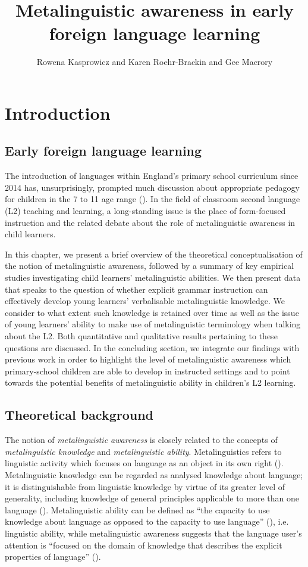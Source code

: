\documentclass[output=paper]{langscibook}
\author{Rowena Kasprowicz\orcid{}\affiliation{University of Reading} and Karen Roehr-Brackin\orcid{}\affiliation{University of Essex} and Gee Macrory\orcid{}\affiliation{Manchester Metropolitan University}}
\title{Metalinguistic awareness in early foreign language learning}
\begin{document}
\maketitle

\section{Introduction}
\subsection{Early foreign language learning}

The introduction of languages within England’s primary school curriculum since 2014 has, unsurprisingly, prompted much discussion about appropriate pedagogy for children in the 7 to 11 age range (\citealt{HolmesMyles2019}). In the field of classroom second language (L2) teaching and learning, a long-standing issue is the place of form-focused instruction and the related debate about the role of metalinguistic awareness in child learners.

In this chapter, we present a brief overview of the theoretical conceptualisation of the notion of metalinguistic awareness, followed by a summary of key empirical studies investigating child learners’ metalinguistic abilities. We then present data that speaks to the question of whether explicit grammar instruction can effectively develop young learners’ verbalisable metalinguistic knowledge. We consider to what extent such knowledge is retained over time as well as the issue of young learners’ ability to make use of metalinguistic terminology when talking about the L2. Both quantitative and qualitative results pertaining to these questions are discussed. In the concluding section, we integrate our findings with previous work in order to highlight the level of metalinguistic awareness which primary-school children are able to develop in instructed settings and to point towards the potential benefits of metalinguistic ability in children’s L2 learning. 

\subsection{Theoretical background}

The notion of \textit{metalinguistic awareness} is closely related to the concepts of \textit{metalinguistic knowledge} and \textit{metalinguistic ability}. Metalinguistics refers to linguistic activity which focuses on language as an object in its own right (\citealt{Gombert1992}). Metalinguistic knowledge can be regarded as analysed knowledge about language; it is distinguishable from linguistic knowledge by virtue of its greater level of generality, including knowledge of general principles applicable to more than one language (\citealt{Bialystok2001}). Metalinguistic ability can be defined as “the capacity to use knowledge about language as opposed to the capacity to use language” (\citealt[124]{Bialystok2001}), i.e. linguistic ability, while metalinguistic awareness suggests that the language user’s attention is “focused on the domain of knowledge that describes the explicit properties of language” (\citealt[127]{Bialystok2001}).
\end{document}
